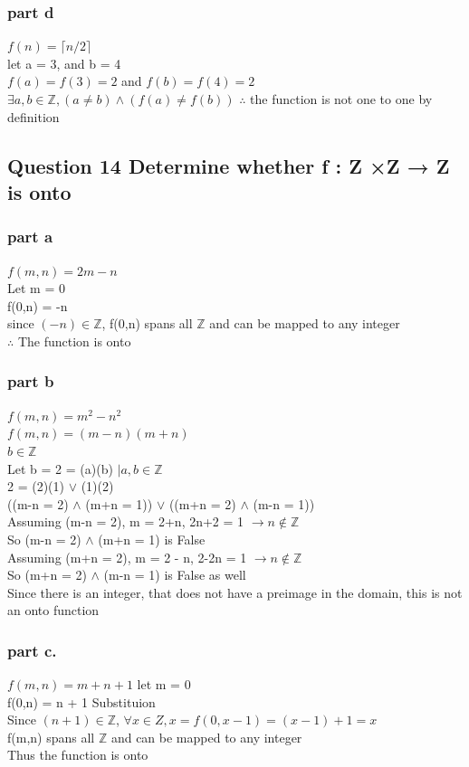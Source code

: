 \documentclass{article}
\begin{document}
\subsubsection{part d}
$f(n) = \lceil n/2 \rceil $\\
let a = 3, and b = 4\\
$f(a) = f(3) = 2$ and $f(b) = f(4) = 2$\\
$\exists a,b \in \mathbb{Z}, (a \neq b) \land (f(a) \neq f(b))$
$\therefore$ the function is not one to one by definition

\subsection{Question 14 Determine whether f : Z ×Z → Z is onto}
\subsubsection{part a}
$f(m,n) = 2m - n$\\
Let m = 0\\
f(0,n) = -n\\
since $(-n) \in \mathbb{Z}$, f(0,n) spans all $\mathbb{Z}$ and can be mapped to any integer\\
$\therefore$ The function is onto

\subsubsection{part b}
$f (m, n)= m^2 - n^2$\\
$f (m, n)= (m-n)(m+n)$\\
$b \in \mathbb{Z}$\\
Let b = 2 = (a)(b) $\mid a,b \in \mathbb{Z}$\\
2 = (2)(1) $\lor$ (1)(2)\\ 
((m-n = 2) $\land$ (m+n = 1)) $\lor$ ((m+n = 2) $\land$ (m-n = 1))\\
Assuming (m-n = 2), m = 2+n, 2n+2 = 1 $\to n \notin \mathbb{Z}$\\
So (m-n = 2) $\land$ (m+n = 1) is False\\
Assuming (m+n = 2), m = 2 - n, 2-2n = 1 $\to n \notin \mathbb{Z}$\\
So (m+n = 2) $\land$ (m-n = 1) is False as well\\
Since there is an integer, that does not have a preimage in the domain, this is not an onto function
\subsubsection{part c.}
$f (m, n)= m +n +1$
let m = 0\\
f(0,n) = n + 1 Substituion\\
Since $(n+1) \in \mathbb{Z}$, $\forall x \in Z, x = f(0,x-1) = (x-1)+1 =x$\\
f(m,n) spans all $\mathbb{Z}$ and can be mapped to any integer\\
Thus the function is onto
\end{document}
